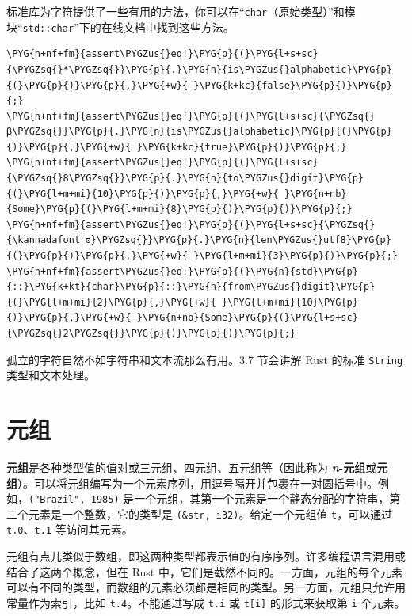 标准库为字符提供了一些有用的方法，你可以在“\texttt{char}（原始类型）”和模块“\texttt{std::char}”下的在线文档中找到这些方法。

\begin{Verbatim}[commandchars=\\\{\},breaklines=true,breakanywhere=true,fontsize=\codefont,xleftmargin=17bp]
\PYG{n+nf+fm}{assert\PYGZus{}eq!}\PYG{p}{(}\PYG{l+s+sc}{\PYGZsq{}*\PYGZsq{}}\PYG{p}{.}\PYG{n}{is\PYGZus{}alphabetic}\PYG{p}{(}\PYG{p}{)}\PYG{p}{,}\PYG{+w}{ }\PYG{k+kc}{false}\PYG{p}{)}\PYG{p}{;}
\PYG{n+nf+fm}{assert\PYGZus{}eq!}\PYG{p}{(}\PYG{l+s+sc}{\PYGZsq{}β\PYGZsq{}}\PYG{p}{.}\PYG{n}{is\PYGZus{}alphabetic}\PYG{p}{(}\PYG{p}{)}\PYG{p}{,}\PYG{+w}{ }\PYG{k+kc}{true}\PYG{p}{)}\PYG{p}{;}
\PYG{n+nf+fm}{assert\PYGZus{}eq!}\PYG{p}{(}\PYG{l+s+sc}{\PYGZsq{}8\PYGZsq{}}\PYG{p}{.}\PYG{n}{to\PYGZus{}digit}\PYG{p}{(}\PYG{l+m+mi}{10}\PYG{p}{)}\PYG{p}{,}\PYG{+w}{ }\PYG{n+nb}{Some}\PYG{p}{(}\PYG{l+m+mi}{8}\PYG{p}{)}\PYG{p}{)}\PYG{p}{;}
\PYG{n+nf+fm}{assert\PYGZus{}eq!}\PYG{p}{(}\PYG{l+s+sc}{\PYGZsq{}{\kannadafont ಠ}\PYGZsq{}}\PYG{p}{.}\PYG{n}{len\PYGZus{}utf8}\PYG{p}{(}\PYG{p}{)}\PYG{p}{,}\PYG{+w}{ }\PYG{l+m+mi}{3}\PYG{p}{)}\PYG{p}{;}
\PYG{n+nf+fm}{assert\PYGZus{}eq!}\PYG{p}{(}\PYG{n}{std}\PYG{p}{::}\PYG{k+kt}{char}\PYG{p}{::}\PYG{n}{from\PYGZus{}digit}\PYG{p}{(}\PYG{l+m+mi}{2}\PYG{p}{,}\PYG{+w}{ }\PYG{l+m+mi}{10}\PYG{p}{)}\PYG{p}{,}\PYG{+w}{ }\PYG{n+nb}{Some}\PYG{p}{(}\PYG{l+s+sc}{\PYGZsq{}2\PYGZsq{}}\PYG{p}{)}\PYG{p}{)}\PYG{p}{;}
\end{Verbatim}

孤立的字符自然不如字符串和文本流那么有用。3.7 节会讲解 Rust 的标准 \texttt{String} 类型和文本处理。

\section{元组}

\textbf{元组}是各种类型值的值对或三元组、四元组、五元组等（因此称为 \textbf{\emph{n}-元组}或\textbf{元组}）。可以将元组编写为一个元素序列，用逗号隔开并包裹在一对圆括号中。例如，\texttt{("Brazil", 1985)} 是一个元组，其第一个元素是一个静态分配的字符串，第二个元素是一个整数，它的类型是 \texttt{(\&str, i32)}。给定一个元组值 \texttt{t}，可以通过 \texttt{t.0}、\texttt{t.1} 等访问其元素。

元组有点儿类似于数组，即这两种类型都表示值的有序序列。许多编程语言混用或结合了这两个概念，但在 Rust 中，它们是截然不同的。一方面，元组的每个元素可以有不同的类型，而数组的元素必须都是相同的类型。另一方面，元组只允许用常量作为索引，比如 \texttt{t.4}。不能通过写成 \texttt{t.i} 或 \texttt{t[i]} 的形式来获取第 \texttt{i} 个元素。

